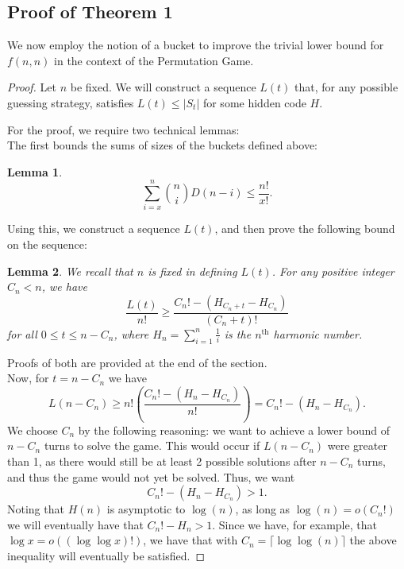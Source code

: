 \documentclass[12pt, a4paper]{article}
\newcommand{\nth}{^{\text{th}}}       %
\newtheorem{lemma}{Lemma}
\begin{document}
	\subsection{Proof of Theorem 1}
	We now employ the notion of a bucket to improve the trivial lower bound for $f(n, n)$ in the context of the Permutation Game.
	\begin{proof}[Proof]
		 Let $n$ be fixed. We will construct a sequence $L(t)$ that, for any possible guessing strategy, satisfies $L(t) \leq |S_t|$ for some hidden code $H$. 
		 
		 For the proof, we require two technical lemmas: \\
		 The first bounds the sums of sizes of the buckets defined above:
		 \begin{lemma}
		 	\begin{equation*}
		 	\sum_{i=x}^n\binom{n}{i}D(n-i) \le \frac{n!}{x!}.
		 	\end{equation*}
		 \end{lemma}
		 
		 Using this, we construct a sequence $L(t)$, and then prove the following bound on the sequence:
		 \begin{lemma} We recall that $n$ is fixed in defining $L(t)$. For any positive integer $C_n < n$, we have
		 	\begin{equation*}
		 	\frac{L(t)}{n!}\ge \frac{C_{n}! - (H_{C_{n}+t} - H_{C_{n}})}{(C_n+t)!}
		 	\end{equation*}
		 	for all $0\le t\le n-C_{n}$, where $H_n=\sum_{i = 1}^n\frac{1}{i}$ is the $n\nth$ harmonic number.
		 \end{lemma}
		 Proofs of both are provided at the end of the section.\\
		 
		 Now, for $t = n-C_n$ we have
		 \begin{equation*}
		 L(n-C_{n})  \ge n!\left(\frac{C_{n}! - (H_n - H_{C_{n}})}{n!}\right)
		 = C_{n}! - (H_n-H_{C_{n}}).
		 \end{equation*}
		 We choose $C_{n}$ by the following reasoning: we want to achieve a lower bound of $n-C_{n}$ turns to solve the game. This would occur if $L(n-C_n)$ were greater than 1, as there would still be at least 2 possible solutions after $n-C_n$ turns, and thus the game would not yet be solved. Thus, we want
		 \begin{equation*}
		 C_{n}! - (H_n - H_{C_{n}}) > 1.
		 \end{equation*}
		 Noting that $H(n)$ is asymptotic to $\log(n)$, as long as $\log(n) = o(C_n!)$ we will eventually have that $C_n!-H_n > 1$. Since we have, for example, that $\log x = o((\log \log x)!)$, we have that with $C_n = \lceil \log \log(n) \rceil$ the above inequality will eventually be satisfied.
		 

\end{proof}
\end{document}
